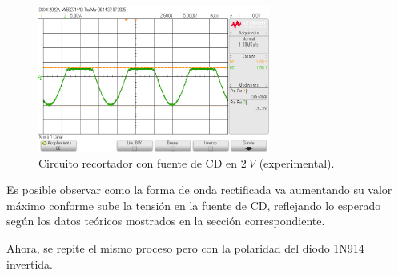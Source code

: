 \documentclass[journal]{IEEEtran}
\begin{document}
\begin{figure}[H]
        \centering
        \includegraphics[width=3in]{SignalExperimental_10.png}
        \caption{Circuito recortador con fuente de CD en $2~V$ (experimental).}
        \label{fig:SignalExperimental_10}
\end{figure}

Es posible observar como la forma de onda rectificada va aumentando su valor máximo conforme sube la tensión en la fuente de CD,
reflejando lo esperado según los datos teóricos mostrados en la sección correspondiente. 

Ahora, se repite el mismo proceso pero con la polaridad del diodo 1N914 invertida. 
\end{document}
